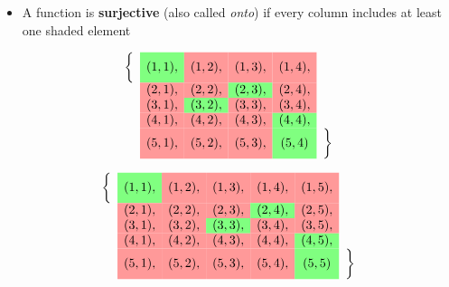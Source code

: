\documentclass[10pt]{beamer}
\begin{document}
\begin{frame}
\footnotesize 

\begin{myyellowbox}[title=Surjective]
\begin{itemize}
	\item A function is \textbf{surjective} (also called \textit{onto}) if every column includes at least one shaded element 
\end{itemize}
\end{myyellowbox}

\vfill 
\begin{mygreenbox}[title=Example]
    \[
    \begin{array}{cccccc}
        \bigg\{ &   \cellcolor{green!50} (1,1), & \cellcolor{red!40} (1,2), & \cellcolor{red!40} (1,3), & \cellcolor{red!40} (1,4), & \\
         & \cellcolor{red!40} (2,1), & \cellcolor{red!40} (2,2), & \cellcolor{green!50} (2,3), & \cellcolor{red!40} (2,4),& \\
        & \cellcolor{red!40} (3,1), & \cellcolor{green!50} (3,2), & \cellcolor{red!40} (3,3), & \cellcolor{red!40} (3,4), & \\
        & \cellcolor{red!40} (4,1), & \cellcolor{red!40} (4,2), & \cellcolor{red!40} (4,3), & \cellcolor{green!50} (4,4), & \\
        & \cellcolor{red!40} (5,1), & \cellcolor{red!40} (5,2), & \cellcolor{red!40} (5,3), & \cellcolor{green!50} (5,4)   &   \bigg\} \\
    \end{array}
    \]
\end{mygreenbox}   
 \vfill 
\begin{myredbox}[title=Anti-Example]
     \[
    \begin{array}{ccccccc}
        \bigg\{ &   \cellcolor{green!50} (1,1), & \cellcolor{red!40} (1,2), & \cellcolor{red!40} (1,3), & \cellcolor{red!40} (1,4), & \cellcolor{red!40} (1,5), &\\
         & \cellcolor{red!40} (2,1), & \cellcolor{red!40} (2,2), & \cellcolor{red!40} (2,3), & \cellcolor{green!50} (2,4), & \cellcolor{red!40} (2,5), &\\
        & \cellcolor{red!40} (3,1), & \cellcolor{red!40} (3,2), & \cellcolor{green!50} (3,3), & \cellcolor{red!40} (3,4), & \cellcolor{red!40} (3,5), &\\
        & \cellcolor{red!40} (4,1), & \cellcolor{red!40} (4,2), & \cellcolor{red!40} (4,3), & \cellcolor{red!40} (4,4), & \cellcolor{green!50} (4,5), & \\
        & \cellcolor{red!40} (5,1), & \cellcolor{red!40} (5,2), & \cellcolor{red!40} (5,3), & \cellcolor{red!40} (5,4), & \cellcolor{green!50} (5,5) & \bigg\} \\
    \end{array}
    \]
\end{myredbox}

\end{frame}
\end{document}
